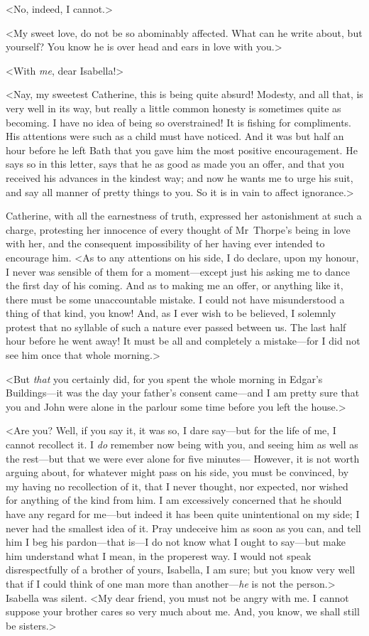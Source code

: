  <No, indeed, I cannot.> 

 <My sweet love, do not be so abominably affected. What can he write about, but yourself? You know he is over head and ears in love with you.> 

 <With \textit{me}, dear Isabella!> 

 <Nay, my sweetest Catherine, this is being quite absurd! Modesty, and all that, is very well in its way, but really a little common honesty is sometimes quite as becoming. I have no idea of being so overstrained! It is fishing for compliments. His attentions were such as a child must have noticed. And it was but half an hour before he left Bath that you gave him the most positive encouragement. He says so in this letter, says that he as good as made you an offer, and that you received his advances in the kindest way; and now he wants me to urge his suit, and say all manner of pretty things to you. So it is in vain to affect ignorance.> 

 Catherine, with all the earnestness of truth, expressed her astonishment at such a charge, protesting her innocence of every thought of Mr~Thorpe's being in love with her, and the consequent impossibility of her having ever intended to encourage him. <As to any attentions on his side, I do declare, upon my honour, I never was sensible of them for a moment—except just his asking me to dance the first day of his coming. And as to making me an offer, or anything like it, there must be some unaccountable mistake. I could not have misunderstood a thing of that kind, you know! And, as I ever wish to be believed, I solemnly protest that no syllable of such a nature ever passed between us. The last half hour before he went away! It must be all and completely a mistake—for I did not see him once that whole morning.> 

 <But \textit{that} you certainly did, for you spent the whole morning in Edgar's Buildings—it was the day your father's consent came—and I am pretty sure that you and John were alone in the parlour some time before you left the house.> 

 <Are you? Well, if you say it, it was so, I dare say—but for the life of me, I cannot recollect it. I \textit{do} remember now being with you, and seeing him as well as the rest—but that we were ever alone for five minutes— However, it is not worth arguing about, for whatever might pass on his side, you must be convinced, by my having no recollection of it, that I never thought, nor expected, nor wished for anything of the kind from him. I am excessively concerned that he should have any regard for me—but indeed it has been quite unintentional on my side; I never had the smallest idea of it. Pray undeceive him as soon as you can, and tell him I beg his pardon—that is—I do not know what I ought to say—but make him understand what I mean, in the properest way. I would not speak disrespectfully of a brother of yours, Isabella, I am sure; but you know very well that if I could think of one man more than another—\textit{he} is not the person.> Isabella was silent. <My dear friend, you must not be angry with me. I cannot suppose your brother cares so very much about me. And, you know, we shall still be sisters.> 

